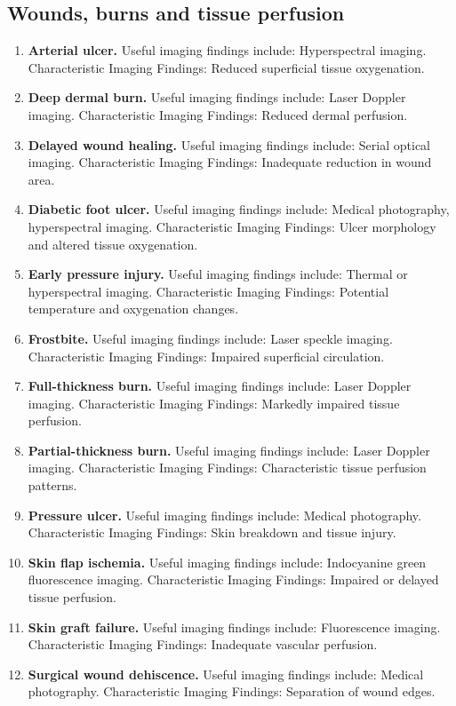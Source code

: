 \subsection{Wounds, burns and tissue perfusion}
\begin{enumerate}[leftmargin=*,itemsep=0.45em,topsep=0.4em]
\item \textbf{Arterial ulcer.} Useful imaging findings include: Hyperspectral imaging. Characteristic Imaging Findings: Reduced superficial tissue oxygenation.
\item \textbf{Deep dermal burn.} Useful imaging findings include: Laser Doppler imaging. Characteristic Imaging Findings: Reduced dermal perfusion.
\item \textbf{Delayed wound healing.} Useful imaging findings include: Serial optical imaging. Characteristic Imaging Findings: Inadequate reduction in wound area.
\item \textbf{Diabetic foot ulcer.} Useful imaging findings include: Medical photography, hyperspectral imaging. Characteristic Imaging Findings: Ulcer morphology and altered tissue oxygenation.
\item \textbf{Early pressure injury.} Useful imaging findings include: Thermal or hyperspectral imaging. Characteristic Imaging Findings: Potential temperature and oxygenation changes.
\item \textbf{Frostbite.} Useful imaging findings include: Laser speckle imaging. Characteristic Imaging Findings: Impaired superficial circulation.
\item \textbf{Full-thickness burn.} Useful imaging findings include: Laser Doppler imaging. Characteristic Imaging Findings: Markedly impaired tissue perfusion.
\item \textbf{Partial-thickness burn.} Useful imaging findings include: Laser Doppler imaging. Characteristic Imaging Findings: Characteristic tissue perfusion patterns.
\item \textbf{Pressure ulcer.} Useful imaging findings include: Medical photography. Characteristic Imaging Findings: Skin breakdown and tissue injury.
\item \textbf{Skin flap ischemia.} Useful imaging findings include: Indocyanine green fluorescence imaging. Characteristic Imaging Findings: Impaired or delayed tissue perfusion.
\item \textbf{Skin graft failure.} Useful imaging findings include: Fluorescence imaging. Characteristic Imaging Findings: Inadequate vascular perfusion.
\item \textbf{Surgical wound dehiscence.} Useful imaging findings include: Medical photography. Characteristic Imaging Findings: Separation of wound edges.

\end{enumerate}
